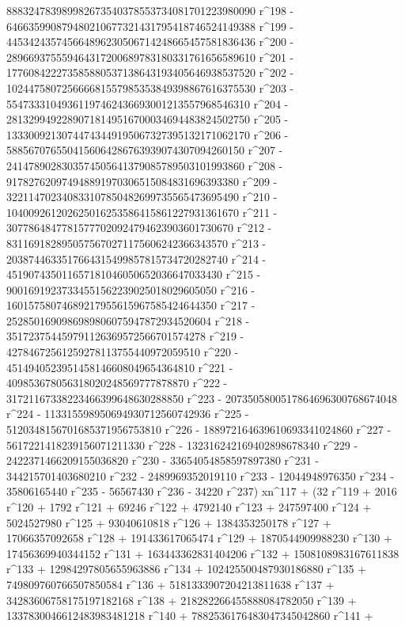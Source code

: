        888324783989982673540378553734081701223980090 r^198 - 
       646635990879480210677321431795418746524149388 r^199 - 
       445342435745664896230506714248665457581836436 r^200 - 
       289669375559464317200689783180331761656589610 r^201 - 
       177608422273585880537138643193405646938537520 r^202 - 
       102447580725666681557985353849398867616375530 r^203 - 
       55473331049361197462436693001213557968546310 r^204 - 
       28132994922890718149516700034694483824502750 r^205 - 
       13330092130744743449195067327395132171062170 r^206 - 
       5885670765504156064286763939074307094260150 r^207 - 
       2414789028303574505641379085789503101993860 r^208 - 
       917827620974948891970306515084831696393380 r^209 - 
       322114702340833107850482699735565473695490 r^210 - 
       104009261202625016253586415861227931361670 r^211 - 
       30778648477815777020924794623903601730670 r^212 - 
       8311691828950575670271175606242366343570 r^213 - 
       2038744633517664315499857815734720282740 r^214 - 
       451907435011657181046050652036647033430 r^215 - 
       90016919237334551562239025018029605050 r^216 - 
       16015758074689217955615967585424644350 r^217 - 
       2528501690986989806075947872934520604 r^218 - 
       351723754459791126369572566701574278 r^219 - 
       42784672561259278113755440972059510 r^220 - 
       4514940523951458146608049654364810 r^221 - 
       409853678056318020248569777878870 r^222 - 
       31721167338223466399648630288850 r^223 - 
       2073505800517864696300768674048 r^224 - 
       113315598950694930712560742936 r^225 - 
       5120348156701685371956753810 r^226 - 
       188972164639610693341024860 r^227 - 
       5617221418239156071211330 r^228 - 
       132316242169402898678340 r^229 - 
       2422371466209155036820 r^230 - 33654054858597897380 r^231 - 
       344215701403680210 r^232 - 2489969352019110 r^233 - 
       12044948976350 r^234 - 35806165440 r^235 - 56567430 r^236 - 
       34220 r^237) xn^117 + (32 r^119 + 2016 r^120 + 1792 r^121 + 
       69246 r^122 + 4792140 r^123 + 247597400 r^124 + 
       5024527980 r^125 + 93040610818 r^126 + 1384353250178 r^127 + 
       17066357092658 r^128 + 191433617065474 r^129 + 
       1870544909988230 r^130 + 17456369940344152 r^131 + 
       163443362831404206 r^132 + 1508108983167611838 r^133 + 
       12984297805655963886 r^134 + 102425500487930186880 r^135 + 
       749809760766507850584 r^136 + 5181333907204213811638 r^137 + 
       34283606758175197182168 r^138 + 
       218282266455888084782050 r^139 + 
       1337830046612483983481218 r^140 + 
       7882536176483047345042860 r^141 + 
